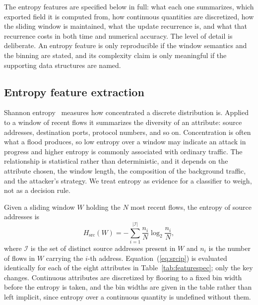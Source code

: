\documentclass{ieeeaccess}
\begin{document}
The entropy features are specified below in full: what each one summarizes, which exported field it is computed from, how continuous quantities are discretized, how the sliding window is maintained, what the update recurrence is, and what that recurrence costs in both time and numerical accuracy. The level of detail is deliberate. An entropy feature is only reproducible if the window semantics and the binning are stated, and its complexity claim is only meaningful if the supporting data structures are named.

\subsection{Entropy feature extraction}
Shannon entropy~\cite{shannon1948mathematical} measures how concentrated a discrete distribution is. Applied to a window of recent flows it summarizes the diversity of an attribute: source addresses, destination ports, protocol numbers, and so on. Concentration is often what a flood produces, so low entropy over a window may indicate an attack in progress and higher entropy is commonly associated with ordinary traffic. The relationship is statistical rather than deterministic, and it depends on the attribute chosen, the window length, the composition of the background traffic, and the attacker's strategy. We treat entropy as evidence for a classifier to weigh, not as a decision rule.

Given a sliding window $W$ holding the $N$ most recent flows, the entropy of source addresses is
\begin{equation}
H_{\mathrm{src}}(W) = -\sum_{i=1}^{|\mathcal{I}|} \frac{n_i}{N} \log_2 \frac{n_i}{N},
\label{eq:srcip}
\end{equation}
where $\mathcal{I}$ is the set of distinct source addresses present in $W$ and $n_i$ is the number of flows in $W$ carrying the $i$-th address. Equation~(\ref{eq:srcip}) is evaluated identically for each of the eight attributes in Table~\ref{tab:featurespec}; only the key changes. Continuous attributes are discretized by flooring to a fixed bin width before the entropy is taken, and the bin widths are given in the table rather than left implicit, since entropy over a continuous quantity is undefined without them.
\end{document}
